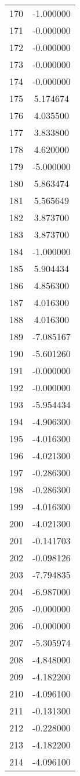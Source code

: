 \documentclass[12pt]{article}
\begin{document}
\begin{longtable}{@{}cc@{}}
170 & -1.000000 \\
171 & -0.000000 \\
172 & -0.000000 \\
173 & -0.000000 \\
174 & -0.000000 \\
175 & 5.174674 \\
176 & 4.035500 \\
177 & 3.833800 \\
178 & 4.620000 \\
179 & -5.000000 \\
180 & 5.863474 \\
181 & 5.565649 \\
182 & 3.873700 \\
183 & 3.873700 \\
184 & -1.000000 \\
185 & 5.904434 \\
186 & 4.856300 \\
187 & 4.016300 \\
188 & 4.016300 \\
189 & -7.085167 \\
190 & -5.601260 \\
191 & -0.000000 \\
192 & -0.000000 \\
193 & -5.954434 \\
194 & -4.906300 \\
195 & -4.016300 \\
196 & -4.021300 \\
197 & -0.286300 \\
198 & -0.286300 \\
199 & -4.016300 \\
200 & -4.021300 \\
201 & -0.141703 \\
202 & -0.098126 \\
203 & -7.794835 \\
204 & -6.987000 \\
205 & -0.000000 \\
206 & -0.000000 \\
207 & -5.305974 \\
208 & -4.848000 \\
209 & -4.182200 \\
210 & -4.096100 \\
211 & -0.131300 \\
212 & -0.228000 \\
213 & -4.182200 \\
214 & -4.096100 \\

\end{longtable}
\end{document}
